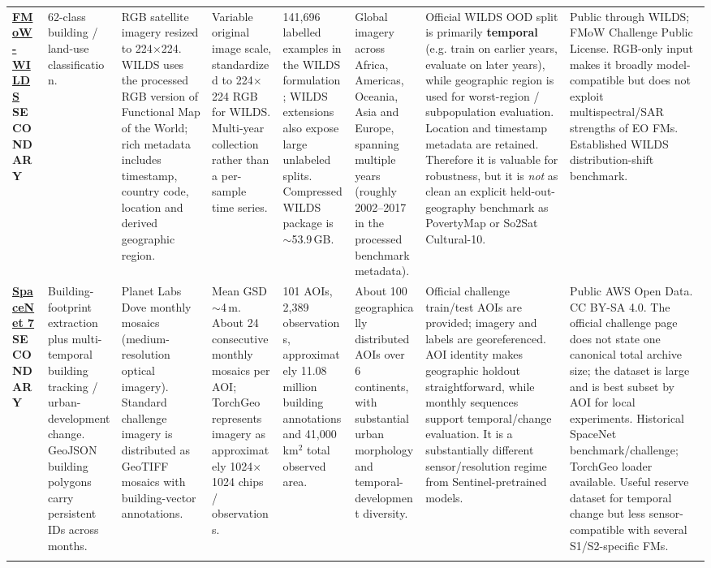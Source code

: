 \begin{landscape}
\begin{longtable}{
    Q{1.8cm}
    Q{2.5cm}
    Q{3.0cm}
    Q{2.5cm}
    Q{2.1cm}
    Q{3.0cm}
    Q{3.4cm}
    Q{3.4cm}
}
\href{https://wilds.stanford.edu/datasets/}{\textbf{FMoW-WILDS}}\newline
\textbf{SECONDARY}
&
62-class building / land-use classification.
&
RGB satellite imagery resized to 224$\times$224. WILDS uses the processed RGB version of Functional Map of the World; rich metadata includes timestamp, country code, location and derived geographic region.
&
Variable original image scale, standardized to 224$\times$224 RGB for WILDS. Multi-year collection rather than a per-sample time series.
&
141,696 labelled examples in the WILDS formulation; WILDS extensions also expose large unlabeled splits. Compressed WILDS package is $\sim$53.9\,GB.
&
Global imagery across Africa, Americas, Oceania, Asia and Europe, spanning multiple years (roughly 2002--2017 in the processed benchmark metadata).
&
Official WILDS OOD split is primarily \textbf{temporal} (e.g. train on earlier years, evaluate on later years), while geographic region is used for worst-region / subpopulation evaluation. Location and timestamp metadata are retained. Therefore it is valuable for robustness, but it is \emph{not} as clean an explicit held-out-geography benchmark as PovertyMap or So2Sat Cultural-10.
&
Public through WILDS; FMoW Challenge Public License. RGB-only input makes it broadly model-compatible but does not exploit multispectral/SAR strengths of EO FMs. Established WILDS distribution-shift benchmark.
\\
\addlinespace

\href{https://www.spacenet.ai/sn7-challenge/}{\textbf{SpaceNet 7}}\newline
\textbf{SECONDARY}
&
Building-footprint extraction plus multi-temporal building tracking / urban-development change. GeoJSON building polygons carry persistent IDs across months.
&
Planet Labs Dove monthly mosaics (medium-resolution optical imagery). Standard challenge imagery is distributed as GeoTIFF mosaics with building-vector annotations.
&
Mean GSD $\sim$4\,m. About 24 consecutive monthly mosaics per AOI; TorchGeo represents imagery as approximately 1024$\times$1024 chips / observations.
&
101 AOIs, 2,389 observations, approximately 11.08 million building annotations and 41,000\,km$^2$ total observed area.
&
About 100 geographically distributed AOIs over 6 continents, with substantial urban morphology and temporal-development diversity.
&
Official challenge train/test AOIs are provided; imagery and labels are georeferenced. AOI identity makes geographic holdout straightforward, while monthly sequences support temporal/change evaluation. It is a substantially different sensor/resolution regime from Sentinel-pretrained models.
&
Public AWS Open Data. CC BY-SA 4.0. The official challenge page does not state one canonical total archive size; the dataset is large and is best subset by AOI for local experiments. Historical SpaceNet benchmark/challenge; TorchGeo loader available. Useful reserve dataset for temporal change but less sensor-compatible with several S1/S2-specific FMs.
\\
\addlinespace


\end{longtable}
\end{landscape}
